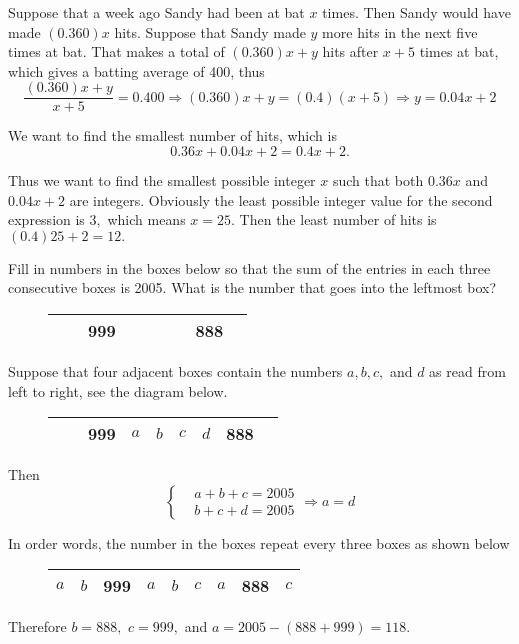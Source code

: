 \documentclass{article}
\begin{document}
\begin{soln}
    Suppose that a week ago Sandy had been at bat $x$ times. Then Sandy would have made $(0.360)x$ hits.
    Suppose that Sandy made $y$ more hits in the next five times at bat.
    That makes a total of $(0.360)x+y$ hits after $x+5$ times at bat, which gives a batting average of 400, thus
    \[
        \frac{(0.360)x+y}{x+5} = 0.400 \Rightarrow (0.360)x+y = (0.4)(x+5) \Rightarrow y = 0.04 x + 2
    \]
    
    We want to find the smallest number of hits, which is 
    \[
        0.36 x + 0.04 x + 2 = 0.4x + 2.
    \]

    Thus we want to find the smallest possible integer $x$ such that both $0.36 x$ and $0.04 x + 2$ are integers.
    Obviously the least possible integer value for the second expression is $3,$ which means $x = 25.$
    Then the least number of hits is $(0.4)25 + 2 = \boxed{12.}$
\end{soln}

\begin{example}
    Fill in numbers in the boxes below so that the sum of the entries in each three consecutive boxes is 2005.
    What is the number that goes into the leftmost box?
\end{example}

\begin{figure}[h]
    \centering
    \begin{tabular}{|l|l|l|l|l|l|l|l|l|}
    \hline
    &  & 999 &  &  &  &  & 888 & \\ \hline
    \end{tabular}
\end{figure}

\begin{soln}
    Suppose that four adjacent boxes contain the numbers $a,b,c,$ and $d$ as read from left to right, see the diagram below.
    \begin{figure}[h]
        \centering
        \begin{tabular}{|l|l|l|l|l|l|l|l|l|}
        \hline
         &  & 999 & $a$ & $b$ & $c$ & $d$ & 888 & \\ \hline
        \end{tabular}
    \end{figure}

    Then 
    \[
        \begin{cases}
            &a+b+c = 2005\\
            &b+c+d = 2005
        \end{cases}
        \Rightarrow a = d
    \]

    In order words, the number in the boxes repeat every three boxes as shown below
    \begin{figure}[h]
        \centering
        \begin{tabular}{|l|l|l|l|l|l|l|l|l|}
        \hline
         $a$ & $b$ & 999 & $a$ & $b$ & $c$ & $a$ & 888 & $c$ \\ \hline
        \end{tabular}
    \end{figure}

    Therefore $b=888,$ $c=999,$ and $a = 2005-(888+999)=\boxed{118.}$
\end{soln}
\end{document}
